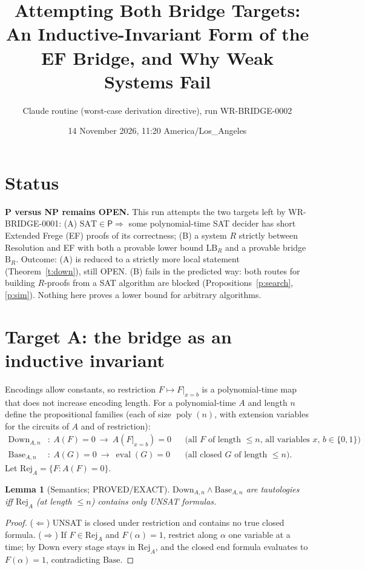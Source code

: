 \documentclass[11pt]{article}
\title{Attempting Both Bridge Targets:\\
An Inductive-Invariant Form of the EF Bridge, and Why Weak Systems Fail}
\author{Claude routine (worst-case derivation directive), run WR-BRIDGE-0002}
\date{14 November 2026, 11:20 America/Los\_Angeles}
\newtheorem{lemma}[theorem]{Lemma}
\newcommand{\SAT}{\mathrm{SAT}}
\newcommand{\Pc}{\mathsf P}
\newcommand{\poly}{\operatorname{poly}}
\newcommand{\Down}{\mathrm{Down}}
\newcommand{\Base}{\mathrm{Base}}
\begin{document}
\maketitle

\section*{Status}
\textbf{P versus NP remains OPEN.} This run attempts the two targets left by
WR-BRIDGE-0001:
(A) $\SAT\in\Pc\Rightarrow$ some polynomial-time SAT decider has short
Extended Frege (EF) proofs of its correctness;
(B) a system $R$ strictly between Resolution and EF with both a provable lower
bound $\mathrm{LB}_R$ and a provable bridge $\mathrm B_R$.
Outcome: (A) is reduced to a strictly more local statement (Theorem~\ref{t:down}),
still OPEN. (B) fails in the predicted way: both routes for building
$R$-proofs from a SAT algorithm are blocked (Propositions~\ref{p:search},
\ref{p:sim}). Nothing here proves a lower bound for arbitrary algorithms.

\section{Target A: the bridge as an inductive invariant}
Encodings allow constants, so restriction $F\mapsto F|_{x=b}$ is a
polynomial-time map that does not increase encoding length. For a
polynomial-time $A$ and length $n$ define the propositional families
(each of size $\poly(n)$, with extension variables for the circuits of $A$
and of restriction):
\begin{align*}
\Down_{A,n}&:\ A(F)=0\ \rightarrow\ A(F|_{x=b})=0
 &&\text{(all $F$ of length $\le n$, all variables $x$, $b\in\{0,1\}$)},\\
\Base_{A,n}&:\ A(G)=0\ \rightarrow\ \operatorname{eval}(G)=0
 &&\text{(all closed $G$ of length $\le n$)}.
\end{align*}
Let $\mathrm{Rej}_A=\{F: A(F)=0\}$.

\begin{lemma}[Semantics; PROVED/EXACT]\label{l:sem}
$\Down_{A,n}\wedge\Base_{A,n}$ are tautologies iff $\mathrm{Rej}_A$ (at length
$\le n$) contains only UNSAT formulas.
\end{lemma}
\begin{proof}
($\Leftarrow$) UNSAT is closed under restriction and contains no true closed
formula. ($\Rightarrow$) If $F\in\mathrm{Rej}_A$ and $F(\alpha)=1$, restrict
along $\alpha$ one variable at a time; by $\Down$ every stage stays in
$\mathrm{Rej}_A$, and the closed end formula evaluates to $F(\alpha)=1$,
contradicting $\Base$.
\end{proof}
\end{document}
